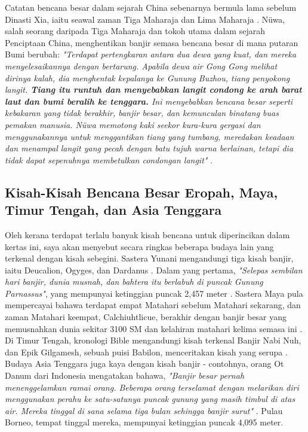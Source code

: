 \documentclass[10pt,twocolumn,letterpaper]{article}
\begin{document}
Catatan bencana besar dalam sejarah China sebenarnya bermula lama sebelum Dinasti Xia, iaitu seawal zaman Tiga Maharaja dan Lima Maharaja \cite{7}. Nüwa, salah seorang daripada Tiga Maharaja dan tokoh utama dalam sejarah Penciptaan China, menghentikan banjir semasa bencana besar di mana putaran Bumi berubah: \textit{"Terdapat pertengkaran antara dua dewa yang kuat, dan mereka menyelesaikannya dengan bertarung. Apabila dewa air Gong Gong melihat dirinya kalah, dia menghentak kepalanya ke Gunung Buzhou, tiang penyokong langit. \textbf{Tiang itu runtuh dan menyebabkan langit condong ke arah barat laut dan bumi beralih ke tenggara.} Ini menyebabkan bencana besar seperti kebakaran yang tidak berakhir, banjir besar, dan kemunculan binatang buas pemakan manusia. Nüwa memotong kaki seekor kura-kura gergasi dan menggunakannya untuk menggantikan tiang yang tumbang, meredakan keadaan dan menampal langit yang pecah dengan batu tujuh warna berlainan, tetapi dia tidak dapat sepenuhnya membetulkan condongan langit"} \cite{8}.

\subsection{Kisah-Kisah Bencana Besar Eropah, Maya, Timur Tengah, dan Asia Tenggara}

Oleh kerana terdapat terlalu banyak kisah bencana untuk diperincikan dalam kertas ini, saya akan menyebut secara ringkas beberapa budaya lain yang terkenal dengan kisah sebegini. Sastera Yunani mengandungi tiga kisah banjir, iaitu Deucalion, Ogyges, dan Dardanus \cite{9,10}. Dalam yang pertama, \textit{"Selepas sembilan hari banjir, dunia musnah, dan bahtera itu berlabuh di puncak Gunung Parnassus"}, yang mempunyai ketinggian puncak 2,457 meter \cite{11}. Sastera Maya pula mempercayai bahawa terdapat empat Matahari sebelum Matahari sekarang, dan zaman Matahari keempat, Calchiuhtlicue, berakhir dengan banjir besar yang memusnahkan dunia sekitar 3100 SM dan kelahiran matahari kelima semasa ini \cite{12}. Di Timur Tengah, kronologi Bible mengandungi kisah terkenal Banjir Nabi Nuh, dan Epik Gilgamesh, sebuah puisi Babilon, menceritakan kisah yang serupa \cite{13}. Budaya Asia Tenggara juga kaya dengan kisah banjir - contohnya, orang Ot Danum dari Indonesia mengatakan bahawa, \textit{"Banjir besar pernah menenggelamkan ramai orang. Beberapa orang terselamat dengan melarikan diri menggunakan perahu ke satu-satunya puncak gunung yang masih timbul di atas air. Mereka tinggal di sana selama tiga bulan sehingga banjir surut"} \cite{3}. Pulau Borneo, tempat tinggal mereka, mempunyai ketinggian puncak 4,095 meter.
\end{document}
